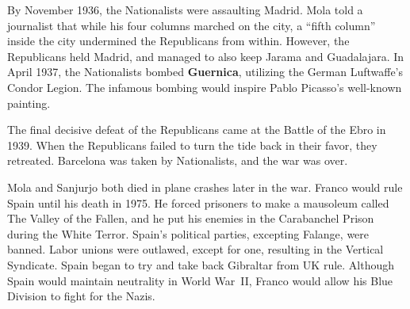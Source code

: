 By November 1936, the Nationalists were assaulting Madrid.
Mola told a journalist that while his four columns marched on the city,
a ``fifth column'' inside the city undermined the Republicans from within.
However, the Republicans held Madrid, and managed to also keep Jarama and Guadalajara.
In April 1937, the Nationalists bombed \textbf{Guernica}, utilizing the German Luftwaffe's Condor Legion.
The infamous bombing would inspire Pablo Picasso's well-known painting.

The final decisive defeat of the Republicans came at the Battle of the Ebro in 1939.
When the Republicans failed to turn the tide back in their favor, they retreated.
Barcelona was taken by Nationalists, and the war was over.

Mola and Sanjurjo both died in plane crashes later in the war.
Franco would rule Spain until his death in 1975.
He forced prisoners to make a mausoleum called The Valley of the Fallen,
and he put his enemies in the Carabanchel Prison during the White Terror.
Spain's political parties, excepting Falange, were banned.
Labor unions were outlawed, except for one, resulting in the Vertical Syndicate.
Spain began to try and take back Gibraltar from UK rule.
Although Spain would maintain neutrality in World War~II, Franco would allow his Blue Division to fight for the Nazis.
